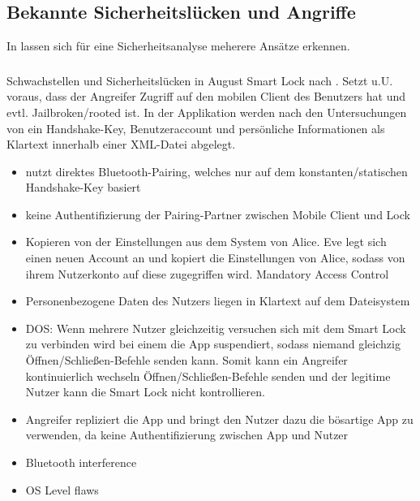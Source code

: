 \subsection{Bekannte Sicherheitslücken und Angriffe}
\label{sec:analysis_weaknesses}
    In  lassen sich für eine Sicherheitsanalyse meherere Ansätze erkennen. 
    
    \subsubsection{}
    Schwachstellen und Sicherheitslücken in August Smart Lock nach \citeauthor{Ye2017}.
	Setzt u.U. voraus, dass der Angreifer Zugriff auf den mobilen Client des Benutzers hat und evtl. Jailbroken/rooted ist.
	In der Applikation werden nach den Untersuchungen von \citeauthor{Ye2017} ein Handshake-Key, Benutzeraccount und persönliche Informationen als Klartext innerhalb einer XML-Datei abgelegt.
	\begin{itemize}
		\item nutzt direktes Bluetooth-Pairing, welches nur auf dem konstanten/statischen Handshake-Key basiert
		\item keine Authentifizierung der Pairing-Partner zwischen Mobile Client und Lock
		\item Kopieren von der Einstellungen aus dem System von Alice.
		    Eve legt sich einen neuen Account an und kopiert die Einstellungen von Alice, sodass von ihrem Nutzerkonto auf diese zugegriffen wird. \textrightarrow Mandatory Access Control
		\item Personenbezogene Daten des Nutzers liegen in Klartext auf dem Dateisystem
		\item DOS: Wenn mehrere Nutzer gleichzeitig versuchen sich mit dem Smart Lock zu verbinden wird bei einem die App suspendiert, sodass niemand gleichzig Öffnen/Schließen-Befehle senden kann.
		    Somit kann ein Angreifer kontinuierlich wechseln Öffnen/Schließen-Befehle senden und der legitime Nutzer kann die Smart Lock nicht kontrollieren.
	   \item Angreifer repliziert die App und bringt den Nutzer dazu die bösartige App zu verwenden, da keine Authentifizierung zwischen App und Nutzer
	   \item Bluetooth interference
	   \item OS Level flaws
	\end{itemize}


